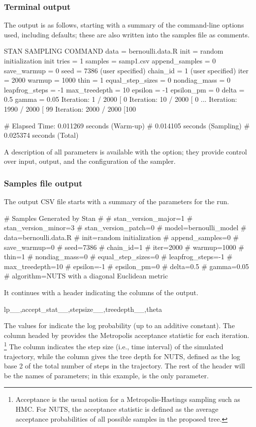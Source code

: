 \documentclass[article]{jss}
\begin{document}
\subsubsection{Terminal output}

The output is as follows, starting with a summary of the command-line
options used, including defaults;  these are also written into the 
samples file as comments.
%
\begin{Code}
STAN SAMPLING COMMAND
data = bernoulli.data.R
init = random initialization
init tries = 1
samples = samp1.csv
append_samples = 0
save_warmup = 0
seed = 7386 (user specified)
chain_id = 1 (user specified)
iter = 2000
warmup = 1000
thin = 1
equal_step_sizes = 0
nondiag_mass = 0
leapfrog_steps = -1
max_treedepth = 10
epsilon = -1
epsilon_pm = 0
delta = 0.5
gamma = 0.05
Iteration:    1 / 2000 [  0%
Iteration:   10 / 2000 [  0%
...
Iteration: 1990 / 2000 [ 99%
Iteration: 2000 / 2000 [100%

# Elapsed Time: 0.011269 seconds (Warm-up)
#               0.014105 seconds (Sampling)
#               0.025374 seconds (Total)
\end{Code}
%
A description of all parameters is available with the 
option; they provide control over input, output, and the configuration
of the sampler.

\subsubsection{Samples file output}

The output CSV file starts with a summary of the parameters for the
run.  
%
\begin{Code}
# Samples Generated by Stan
#
# stan_version_major=1
# stan_version_minor=3
# stan_version_patch=0
# model=bernoulli_model
# data=bernoulli.data.R
# init=random initialization
# append_samples=0
# save_warmup=0
# seed=7386
# chain_id=1
# iter=2000
# warmup=1000
# thin=1
# nondiag_mass=0
# equal_step_sizes=0
# leapfrog_steps=-1
# max_treedepth=10
# epsilon=-1
# epsilon_pm=0
# delta=0.5
# gamma=0.05
# algorithm=NUTS with a diagonal Euclidean metric
\end{Code}
%
It continues with a header indicating the columns of the output.
%
\begin{Code}
lp__,accept_stat__,stepsize__,treedepth__,theta
\end{Code}
%
The values for  indicate the log probability (up to an
additive constant).  The column headed by 
provides the Metropolis acceptance statistic for each iteration.%
%
\footnote{Acceptance is the usual notion for a Metropolis-Hastings
  sampling such as HMC.  For NUTS, the acceptance statistic is 
  defined as the average acceptance probabilities of all possible
  samples in the proposed tree.}
%
The column  indicates the step size
(i.e., time interval) of the simulated trajectory, while the column 
 gives the tree depth for NUTS, defined as the 
log base 2 of the total number of steps in the trajectory.
The rest of the header will be the names of parameters; in this
example,  is the only parameter.
\end{document}

